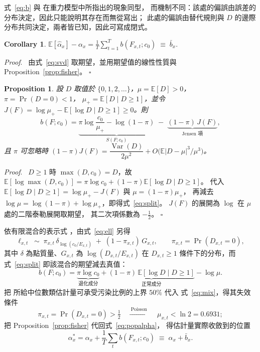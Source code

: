 \documentclass[UTF8, fontset=macnew, a4paper, 12pt]{ctexart}
\newtheorem{prop}{Proposition}
\newtheorem{cor}{Corollary}
\newenvironment{proof}{\par\noindent\textit{Proof}.\ }{\hfill$\square$\par\vspace{4pt}}
\newcommand{\Ex}{\mathbb{E}}
\begin{document}
式~\eqref{eq:b} 與 \citet{santossilva2006} 在重力模型中所指出的現象同型，
而機制不同：該處的偏誤由誤差的分布決定，因此只能說明其存在而無從寫出；
此處的偏誤由替代規則與 $D$ 的邊際分布共同決定，兩者皆已知，因此可寫成閉式。

\begin{cor}\label{cor:alpha}
$\displaystyle \Ex[\hat\alpha_x]-\alpha_x
=\frac{1}{T}\sum_{t=1}^{T} b(F_{x,t};c_0)\;\equiv\;\bar b_x .$
\end{cor}

\begin{proof}
由式~\eqref{eq:svd} 取期望，並用期望值的線性性質與 Proposition~\ref{prop:fisher}。
\end{proof}

\begin{prop}\label{prop:split}
設 $D$ 取值於 $\{0,1,2,\dots\}$，$\mu=\Ex[D]>0$，$\pi=\Pr(D=0)<1$，
$\mu_{+}=\Ex[D\mid D\ge1]$，並令
$J(F)=\log\mu_{+}-\Ex[\log D\mid D\ge1]\ge0$。則
\begin{equation}\label{eq:split}
b(F;c_0)=
\underbrace{\pi\log\frac{c_0}{\mu_{+}}-\log(1-\pi)}_{S(F;c_0)}
\;-\;\underbrace{(1-\pi)\,J(F)}_{\text{Jensen 項}} ,
\end{equation}
且 $\pi$ 可忽略時
$(1-\pi)J(F)=\dfrac{\operatorname{Var}(D)}{2\mu^{2}}
+O\bigl(\Ex|D-\mu|^{3}/\mu^{3}\bigr)$。
\end{prop}

\begin{proof}
$D\ge1$ 時 $\max(D,c_0)=D$，故
$\Ex[\log\max(D,c_0)]=\pi\log c_0+(1-\pi)\Ex[\log D\mid D\ge1]$。
代入 $\Ex[\log D\mid D\ge1]=\log\mu_{+}-J(F)$ 與 $\mu=(1-\pi)\mu_{+}$，
再減去 $\log\mu=\log(1-\pi)+\log\mu_{+}$，即得式~\eqref{eq:split}。
$J(F)$ 的展開為 $\log$ 在 $\mu$ 處的二階泰勒展開取期望，
其二次項係數為 $-\tfrac12$。
\end{proof}

依有限混合的表示式 \citep[§1.2]{yao2024}，由式~\eqref{eq:ell} 另得
\begin{equation}\label{eq:mix}
\ell_{x,t}\;\sim\;\pi_{x,t}\,\delta_{\log(c_0/E_{x,t})}
\;+\;(1-\pi_{x,t})\,G_{x,t},
\qquad \pi_{x,t}=\Pr(D_{x,t}=0),
\end{equation}
其中 $\delta$ 為點質量、$G_{x,t}$ 為 $\log(D_{x,t}/E_{x,t})$ 在
$D_{x,t}\ge1$ 條件下的分布，而式~\eqref{eq:split} 即該混合的期望減去真值：
\begin{equation}\label{eq:bmix}
b(F;c_0)=\underbrace{\pi\log c_0}_{\text{退化成分}}
+\underbrace{(1-\pi)\,\Ex[\log D\mid D\ge1]}_{\text{正常成分}}-\log\mu .
\end{equation}
把 \citet{donoho1983} 所給中位數類估計量可承受污染比例的上界 $50\%$ 代入
式~\eqref{eq:mix}，得其失效條件
\begin{equation}\label{eq:ln2}
\pi_{x,t}=\Pr(D_{x,t}=0)>\tfrac12
\quad\xrightarrow{\ \text{Poisson}\ }\quad
\mu_{x,t}<\ln 2=0.6931 ;
\end{equation}
把 Proposition~\ref{prop:fisher} 代回式~\eqref{eq:popalpha}，
得估計量實際收斂到的位置
\begin{equation}\label{eq:astar}
\alpha_x^{\ast}=\alpha_x+\frac1T\sum_t b(F_{x,t};c_0)
\;\equiv\;\alpha_x+\bar b_x .
\end{equation}
\end{document}
